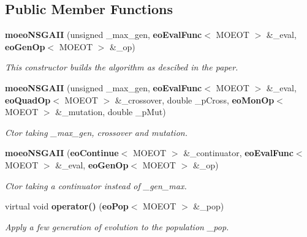 \subsection*{Public Member Functions}
\begin{CompactItemize}
\item 
{\bf moeo\-NSGAII} (unsigned \_\-max\_\-gen, {\bf eo\-Eval\-Func}$<$ MOEOT $>$ \&\_\-eval, {\bf eo\-Gen\-Op}$<$ MOEOT $>$ \&\_\-op)
\begin{CompactList}\small\item\em This constructor builds the algorithm as descibed in the paper. \item\end{CompactList}\item 
{\bf moeo\-NSGAII} (unsigned \_\-max\_\-gen, {\bf eo\-Eval\-Func}$<$ MOEOT $>$ \&\_\-eval, {\bf eo\-Quad\-Op}$<$ MOEOT $>$ \&\_\-crossover, double \_\-p\-Cross, {\bf eo\-Mon\-Op}$<$ MOEOT $>$ \&\_\-mutation, double \_\-p\-Mut)
\begin{CompactList}\small\item\em Ctor taking \_\-max\_\-gen, crossover and mutation. \item\end{CompactList}\item 
{\bf moeo\-NSGAII} ({\bf eo\-Continue}$<$ MOEOT $>$ \&\_\-continuator, {\bf eo\-Eval\-Func}$<$ MOEOT $>$ \&\_\-eval, {\bf eo\-Gen\-Op}$<$ MOEOT $>$ \&\_\-op)
\begin{CompactList}\small\item\em Ctor taking a continuator instead of \_\-gen\_\-max. \item\end{CompactList}\item 
virtual void {\bf operator()} ({\bf eo\-Pop}$<$ MOEOT $>$ \&\_\-pop)
\begin{CompactList}\small\item\em Apply a few generation of evolution to the population \_\-pop. \item\end{CompactList}\end{CompactItemize}

